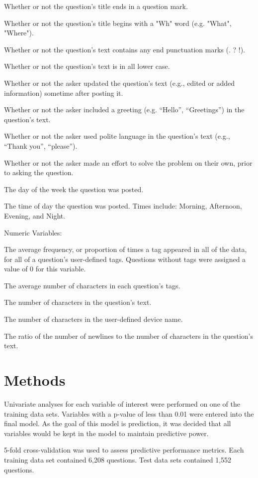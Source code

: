 \documentclass[12pt]{article}
\begin{document}
Whether or not the question's title ends in a question mark.

Whether or not the question's title begins with a "Wh" word (e.g. "What", "Where"). 

Whether or not the question's text contains any end punctuation marks (. ? !). 

Whether or not the question's text is in all lower case. 

Whether or not the asker updated the question's text (e.g., edited or added information) sometime after posting it. 

Whether or not the asker included a greeting (e.g. ``Hello'', ``Greetings'') in the question's text.

Whether or not the asker used polite language in the question's text (e.g., ``Thank you'', ``please''). 

Whether or not the asker made an effort to solve the problem on their own, prior to asking the question.

The day of the week the question was posted. 

The time of day the question was posted. Times include: Morning, Afternoon, Evening, and Night. 

Numeric Variables:

The average frequency, or proportion of times a tag appeared in all of the data, for all of a question's user-defined tags. Questions without tags were assigned a value of 0 for this variable. 

The average number of characters in each question's tags. 

The number of characters in the question's text. 

The number of characters in the user-defined device name. 

The ratio of the number of newlines to the number of characters in the question's text.


\section{Methods} 

Univariate analyses for each variable of interest were performed on one of the training data sets. Variables with a p-value of less than 0.01 were entered into the final model. As the goal of this model is prediction, it was decided that all variables would be kept in the model to maintain predictive power. 

5-fold cross-validation was used to assess predictive performance metrics. Each training data set contained 6,208 questions. Test data sets contained 1,552 questions. 
\end{document}
